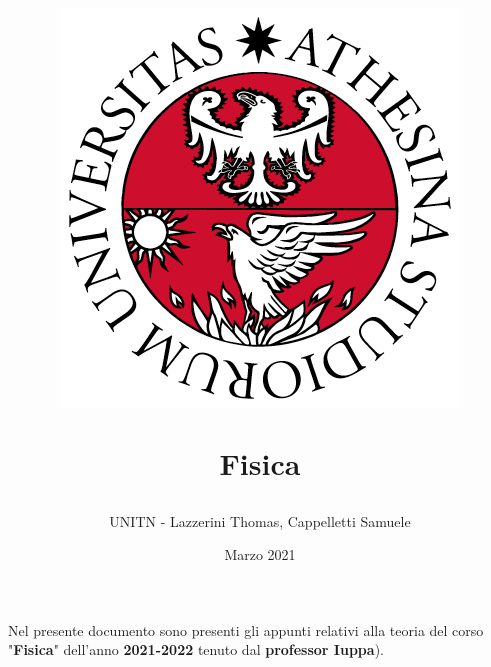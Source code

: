 \documentclass[12pt]{article}
\title{
    \begin{figure}[ht!]
        \centering
        \includegraphics[width=.5\textwidth]{LOGO}
        \label{fig:logo unitn}
    \end{figure}
    \bigskip
    Fisica
}
\author{UNITN - Lazzerini Thomas, Cappelletti Samuele}
\date{Marzo 2021}
\begin{document}
    \maketitle
    \vfill

    \begin{center}
        Nel presente documento sono presenti gli appunti relativi alla teoria del corso "\textbf{Fisica}" dell'anno \textbf{2021-2022} tenuto dal \textbf{professor Iuppa}).\\
    \end{center}

    \newpage

    \tableofcontents

    \newpage

	
	
	
	
\end{document}
